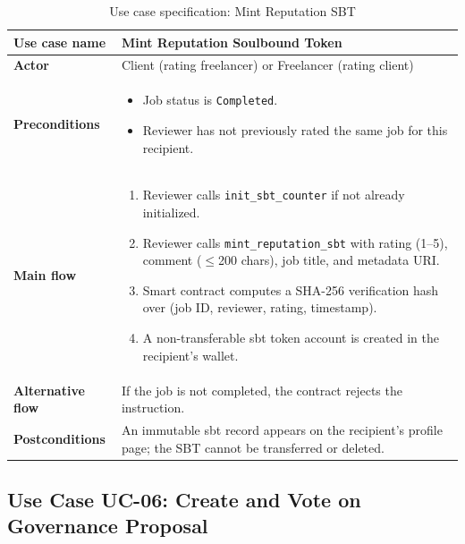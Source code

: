 \begin{table}[H]
\centering
\caption{Use case specification: Mint Reputation SBT}
\label{table:uc05}
\begin{tabular}{|l|p{10cm}|}
\hline
\textbf{Use case name} & Mint Reputation Soulbound Token \\ \hline
\textbf{Actor} & Client (rating freelancer) or Freelancer (rating client) \\ \hline
\textbf{Preconditions} & \begin{itemize}[noitemsep]
    \item Job status is \texttt{Completed}.
    \item Reviewer has not previously rated the same job for this recipient.
\end{itemize} \\ \hline
\textbf{Main flow} & \begin{enumerate}[noitemsep]
    \item Reviewer calls \texttt{init\_sbt\_counter} if not already initialized.
    \item Reviewer calls \texttt{mint\_reputation\_sbt} with rating (1--5), comment ($\leq$200 chars), job title, and metadata URI.
    \item Smart contract computes a SHA-256 verification hash over (job ID, reviewer, rating, timestamp).
    \item A non-transferable \gls{sbt} token account is created in the recipient's wallet.
\end{enumerate} \\ \hline
\textbf{Alternative flow} & If the job is not completed, the contract rejects the instruction. \\ \hline
\textbf{Postconditions} & An immutable \gls{sbt} record appears on the recipient's profile page; the SBT cannot be transferred or deleted. \\ \hline
\end{tabular}
\end{table}

\subsection{Use Case UC-06: Create and Vote on Governance Proposal}
\label{subsection:uc06}

